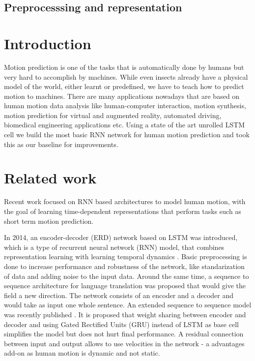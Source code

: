 

\subsection{Preprocesssing and representation}


\section{Introduction}

Motion prediction is one of the tasks that is automatically done by humans but very hard to accomplish by machines. While even insects already have a physical model of the world, either learnt or predefined, we have to teach how to predict motion to machines. There are many applications nowadays that are based on human motion data analysis like human-computer interaction, motion synthesis, motion prediction for virtual and augmented reality, automated driving, biomedical engineering applications etc.
Using a state of the art unrolled LSTM cell we build the most basic RNN network for human motion prediction and took this as our baseline for improvements. 

\section{Related work}
Recent work focused on RNN based architectures to model human motion, with the goal of learning time-dependent representations that perform tasks such as short term motion prediction. 

In 2014, an encoder-decoder (ERD) network based on LSTM was introduced, which is a type of recurrent neural network (RNN) model, that combines representation learning with learning temporal dynamics \cite{Fragkiadaki2014}. Basic preprocessing is done to increase performance and robustness of the network, like standarization of data and adding noise to the input data. Around the same time, a sequence to sequence architecture for language translation was proposed \cite{Sutskever2014} that would give the field a new direction. The network consists of an encoder and a decoder and would take as input one whole sentence. An extended sequence to sequence model was recently published \cite{Martinez2017}. It is proposed that weight sharing between encoder and decoder and using Gated Rectified Units (GRU) instead of LSTM as base cell simplifies the model but does not hurt final performance. A residual connection between input and output allows to use velocities in the network - a advantages add-on as human motion is dynamic and not static. 

